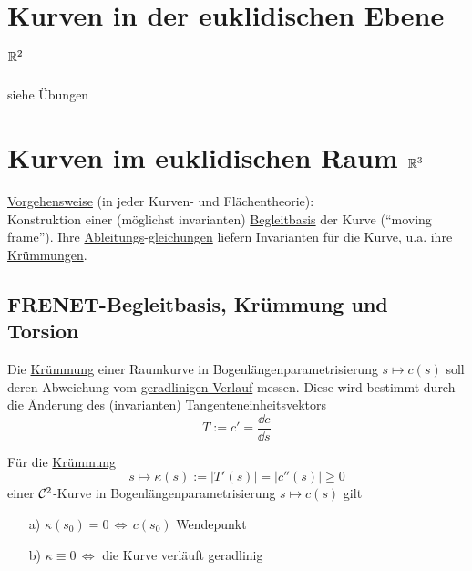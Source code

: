 \section{Kurven in der euklidischen Ebene $\mathbb{R}^2$}
siehe Übungen
\section{Kurven im euklidischen Raum $\mathbb{R}^3$}
\uline{Vorgehensweise} (in jeder Kurven- und Flächentheorie): \\
Konstruktion einer (möglichst invarianten) \uline{Begleitbasis} der Kurve ("`moving frame"'). Ihre \uline{Ableitungs}-\uline{gleichungen} liefern Invarianten für die Kurve, u.a. ihre \uline{Krümmungen}.

\subsection{FRENET-Begleitbasis, Krümmung und Torsion}
Die \uline{Krümmung} einer Raumkurve in Bogenlängenparametrisierung \(s \mapsto c(s)\) soll deren Abweichung vom \uline{geradlinigen Verlauf} messen. Diese wird bestimmt durch die Änderung des (invarianten) Tangenteneinheitsvektors
\[
T := c' = \frac{\dd c}{\dd s}
\]
\begin{satz}\label{satz131}
Für die \uline{Krümmung}
\[
 s \mapsto \kappa(s) := |T'(s)| = |c''(s)| \ge 0
\]
einer \(\mathcal{C}^2\)-Kurve in Bogenlängenparametrisierung \(s \mapsto c(s)\) gilt
\begin{enumerate}
 \item[a)] \(\kappa(s_0)=0 \, \Leftrightarrow \,c(s_0)\) Wendepunkt
 \item[b)] \(\kappa \equiv 0 \, \Leftrightarrow\) die Kurve verläuft geradlinig
\end{enumerate}
\end{satz}

